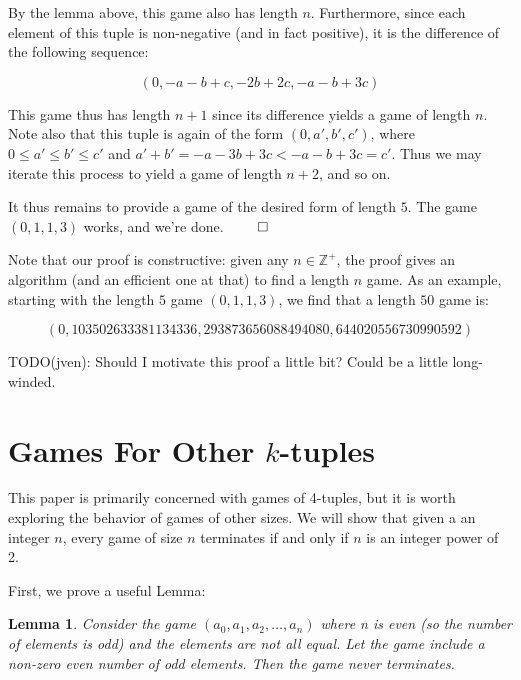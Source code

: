 \documentclass[12pt]{amsart}
\newtheorem{lemma}[theorem]{Lemma}
\newcommand{\zp}{\mathbb{Z}^+}
\begin{document}
By the lemma above, this game also has length $n$. Furthermore, since each element of this tuple is non-negative (and in fact positive), it is the difference of the following sequence:

$$(0, -a - b + c, -2b + 2c, -a - b + 3c)$$

This game thus has length $n + 1$ since its difference yields a game of length $n$. Note also that this tuple is again of the form $(0, a', b', c')$, where $0\leq a'\leq b'\leq c'$ and $a' + b' = -a - 3b + 3c < -a - b + 3c = c'$. Thus we may iterate this process to yield a game of length $n + 2$, and so on.

It thus remains to provide a game of the desired form of length $5$. The game $(0, 1, 1, 3)$ works, and we're done. $\qed$

Note that our proof is constructive: given any $n\in \zp$, the proof gives an algorithm (and an efficient one at that) to find a length $n$ game. As an example, starting with the length $5$ game $(0, 1, 1, 3)$, we find that a length $50$ game is:

$$(0, 103502633381134336, 293873656088494080, 644020556730990592)$$

TODO(jven): Should I motivate this proof a little bit? Could be a little long-winded.

\section{Games For Other $k$-tuples}

This paper is primarily concerned with games of 4-tuples, but it is worth exploring the behavior of games of other sizes. We will show that given a an integer $n$, every game of size $n$ terminates if and only if $n$ is an integer power of 2.

First, we prove a useful Lemma:

\begin {lemma}
Consider the game $(a_0, a_1, a_2, \ldots, a_n)$ where n is even (so the number of elements is odd) and the elements are not all equal. Let the game include a non-zero even number of odd elements. Then the game never terminates.
\label{lem:evenodds}
\end{lemma}
\end{document}
